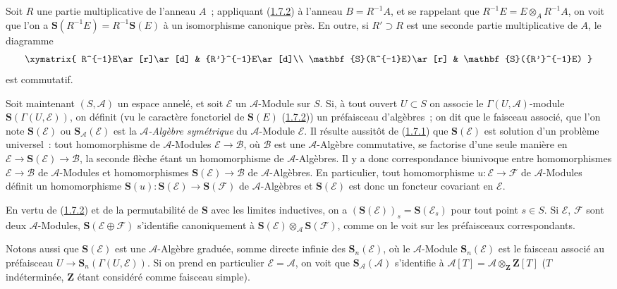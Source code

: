 \begin{env}[1.7.3]
\label{II.1.7.3-fr}
Soit $R$ une partie multiplicative de l'anneau $A$~; appliquant
(\hyperref[II.1.7.2-fr]{1.7.2}) à l'anneau $B=R^{-1}A$, et se rappelant que
$R^{-1}E=E\otimes_A R^{-1}A$, on voit que l'on a
$\mathbf{S}(R^{-1}E)=R^{-1}\mathbf{S}(E)$ à un isomorphisme canonique près.
En outre, si $R'\supset R$ est une seconde partie multiplicative de $A$, le
diagramme
\[
  \xymatrix{
    R^{-1}E\ar[r]\ar[d] & {R'}^{-1}E\ar[d]\\
    \mathbf{S}(R^{-1}E)\ar[r] & \mathbf{S}({R'}^{-1}E)
  }
\]
est commutatif.
\end{env}

\begin{env}[1.7.4]
\label{II.1.7.4-fr}
Soit maintenant $(S,\mathcal{A})$ un espace annelé, et soit $\mathcal{E}$ un
$\mathcal{A}$-Module sur $S$. Si, à tout ouvert $U\subset S$ on associe le
$\Gamma(U,\mathcal{A})$-module
$\mathbf{S}(\Gamma(U,\mathcal{E}))$, on définit (vu le caractère fonctoriel
de $\mathbf{S}(E)$ (\hyperref[II.1.7.2-fr]{1.7.2})) un préfaisceau d'algèbres~;
on dit que le faisceau associé, que l'on note $\mathbf{S}(\mathcal{E})$ ou
$\mathbf{S}_{\mathcal{A}}(\mathcal{E})$ est la \emph{$\mathcal{A}$-Algèbre
symétrique} du $\mathcal{A}$-Module $\mathcal{E}$. Il résulte aussitôt
de (\hyperref[II.1.7.1-fr]{1.7.1}) que $\mathbf{S}(\mathcal{E})$ est solution
d'un problème universel~: tout homomorphisme de $\mathcal{A}$-Modules
$\mathcal{E}\to\mathcal{B}$, où $\mathcal{B}$ est une $\mathcal{A}$-Algèbre commutative,
se factorise d'une seule manière en
$\mathcal{E}\to\mathbf{S}(\mathcal{E})\to\mathcal{B}$, la seconde flèche étant
un homomorphisme de $\mathcal{A}$-Algèbres. Il y a donc correspondance
biunivoque entre homomorphismes $\mathcal{E}\to\mathcal{B}$ de
$\mathcal{A}$-Modules et homomorphismes
$\mathbf{S}(\mathcal{E})\to\mathcal{B}$ de $\mathcal{A}$-Algèbres. En
particulier, tout homomorphisme $u:\mathcal{E}\to\mathcal{F}$ de
$\mathcal{A}$-Modules définit un homomorphisme
$\mathbf{S}(u):\mathbf{S}(\mathcal{E})\to\mathbf{S}(\mathcal{F})$ de
$\mathcal{A}$-Algèbres et $\mathbf{S}(\mathcal{E})$ est donc un foncteur
covariant en $\mathcal{E}$.

En vertu de (\hyperref[II.1.7.2-fr]{1.7.2}) et de la permutabilité de
$\mathbf{S}$ avec les limites inductives, on a
$(\mathbf{S}(\mathcal{E}))_s=\mathbf{S}(\mathcal{E}_s)$ pour tout point
$s\in S$. Si $\mathcal{E}$, $\mathcal{F}$ sont deux $\mathcal{A}$-Modules,
$\mathbf{S}(\mathcal{E}\oplus\mathcal{F})$ s'identifie canoniquement à
$\mathbf{S}(\mathcal{E})\otimes_{\mathcal{A}}\mathbf{S}(\mathcal{F})$,
comme on le voit sur les préfaisceaux correspondants.

Notons aussi que $\mathbf{S}(\mathcal{E})$ est une $\mathcal{A}$-Algèbre
graduée, somme directe infinie des $\mathbf{S}_n(\mathcal{E})$, où le
$\mathcal{A}$-Module $\mathbf{S}_n(\mathcal{E})$ est le faisceau associé au
préfaisceau $U\to\mathbf{S}_n(\Gamma(U,\mathcal{E}))$. Si on prend en
particulier $\mathcal{E}=\mathcal{A}$, on voit que
$\mathbf{S}_{\mathcal{A}}(\mathcal{A})$ s'identifie à
$\mathcal{A}[T]=\mathcal{A}\otimes_{\mathbf{Z}}\mathbf{Z}[T]$
($T$ indéterminée, $\mathbf{Z}$ étant considéré comme faisceau simple).
\end{env}

